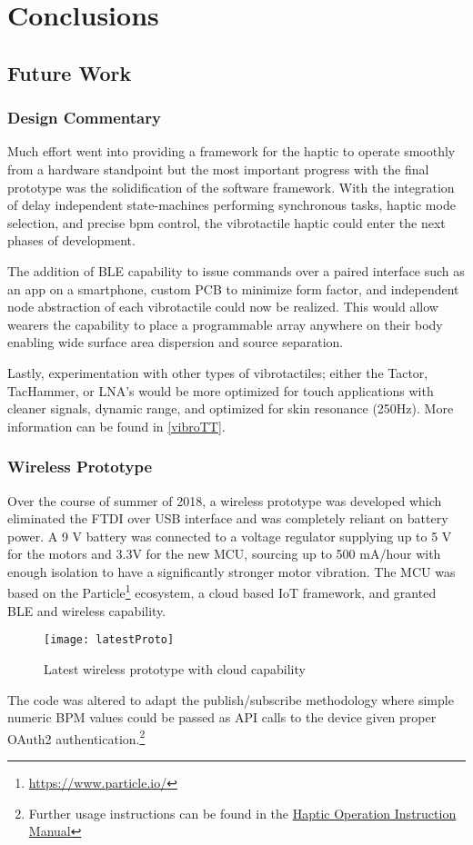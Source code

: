 
\chapter{Conclusions} \label{chapConclusions}

\section{Future Work}
\subsection{Design Commentary}
Much effort went into providing a framework for the haptic to operate smoothly from a hardware standpoint but the most important progress with the final prototype was the solidification of the software framework. With the integration of delay independent state-machines performing synchronous tasks, haptic mode selection, and precise bpm control, the vibrotactile haptic could enter the next phases of development. 

The addition of BLE capability to issue commands over a paired interface such as an app on a smartphone, custom PCB to minimize form factor, and independent node abstraction of each vibrotactile could now be realized. This would allow wearers the capability to place a programmable array anywhere on their body enabling wide surface area dispersion and source separation. 

Lastly, experimentation with other types of vibrotactiles; either the Tactor, TacHammer, or LNA's would be more optimized for touch applications with cleaner signals, dynamic range, and optimized for skin resonance (250Hz). More information can be found in \ref{vibroTT}.

\subsection{Wireless Prototype}\label{wirelessHP}
Over the course of summer of 2018, a wireless prototype was developed which eliminated the FTDI over USB interface and was completely reliant on battery power. A 9 V battery was connected to a voltage regulator supplying up to 5 V for the motors and 3.3V for the new MCU, sourcing up to 500 mA/hour with enough isolation to have a significantly stronger motor vibration. The MCU was based on the Particle\footnote{\url{https://www.particle.io/}} ecosystem, a cloud based IoT framework, and granted BLE and wireless capability.
\begin{figure}[H]
    \centering
    \texttt{[image: latestProto]}
    \caption{Latest wireless prototype with cloud capability}
\end{figure}
The code was altered to adapt the publish/subscribe methodology where simple numeric BPM values could be passed as API calls to the device given proper OAuth2 authentication.\footnote{Further usage instructions can be found in the \href{https://docs.google.com/document/d/1vB0zk6RceEyYD20hWCYP4Afg4Ua1DJR6iZ438ZEw02U/edit?usp=sharing}{Haptic Operation Instruction Manual}}


